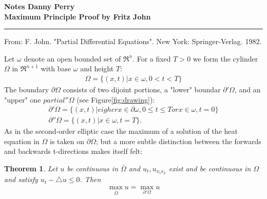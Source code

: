 \documentclass[11pt]{article}
\begin{document}
\thispagestyle{empty}
{\large{\bf Notes \hfill Danny Perry}}\\

{\LARGE{\bf Maximum Principle Proof by Fritz John}}
\vspace{0.2\baselineskip}
\hrule

From: F. John. "Partial Differential Equations".  New York: Springer-Verlag. 1982.


Let $\omega$ denote an open bounded set of $\Re^n$.  For a fixed $T>0$ we form the cylinder $\Omega$ in $\Re^{n+1}$ with base $\omega$ and height $T$:
\begin{align}
\Omega = \{(x,t)|x \in \omega, 0 < t < T \}
\end{align}
The boundary $\partial \Omega$ consists of two dijoint portions, a "lower" boundar $\partial'\Omega$, and an "upper" one $partial''\Omega$ (see Figure\ref{fig:drawing}):
\begin{align}
\partial'\Omega = \{(x,t)|eigher x \in \partial \omega, 0 \le t \le T or x \in \omega, t=0\} \\
\partial''\Omega = \{(x,t)|x \in \omega, t=T\}.
\end{align}
As in the second-order elliptic case the maximum of a solution of the heat equation in $\Omega$ is taken on $\partial \Omega$; but a more subtle distinction between the forwards and backwards t-directions makes itself felt:

\newtheorem{maxthrm}{Theorem}
\begin{maxthrm}
Let $u$ be continuous in $\bar{\Omega}$ and $u_t,u_{x_ix_k}$ exist and be continuous in $\Omega$ and satisfy $u_t-\triangle u \le 0$. Then
\begin{align}
\max_{\bar{\Omega}} u = \max_{\partial ' \Omega} u \label{eqn:thrm}
\end{align}
\end{maxthrm}
\end{document}
